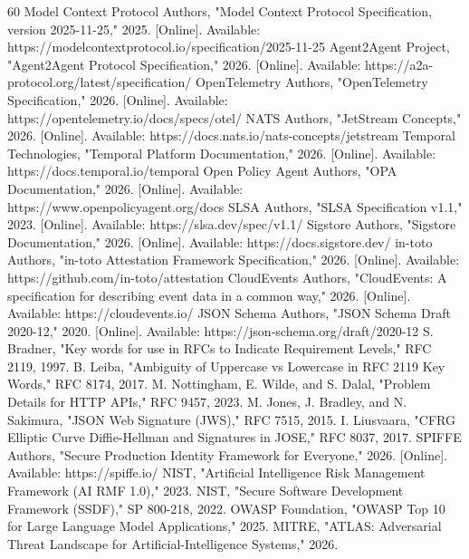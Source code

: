 \documentclass[10pt,journal,onecolumn]{IEEEtran}
\begin{document}
\begin{thebibliography}{60}
 Model Context Protocol Authors, "Model Context Protocol Specification, version 2025-11-25," 2025. [Online]. Available: https://modelcontextprotocol.io/specification/2025-11-25
 Agent2Agent Project, "Agent2Agent Protocol Specification," 2026. [Online]. Available: https://a2a-protocol.org/latest/specification/
 OpenTelemetry Authors, "OpenTelemetry Specification," 2026. [Online]. Available: https://opentelemetry.io/docs/specs/otel/
 NATS Authors, "JetStream Concepts," 2026. [Online]. Available: https://docs.nats.io/nats-concepts/jetstream
 Temporal Technologies, "Temporal Platform Documentation," 2026. [Online]. Available: https://docs.temporal.io/temporal
 Open Policy Agent Authors, "OPA Documentation," 2026. [Online]. Available: https://www.openpolicyagent.org/docs
 SLSA Authors, "SLSA Specification v1.1," 2023. [Online]. Available: https://slsa.dev/spec/v1.1/
 Sigstore Authors, "Sigstore Documentation," 2026. [Online]. Available: https://docs.sigstore.dev/
 in-toto Authors, "in-toto Attestation Framework Specification," 2026. [Online]. Available: https://github.com/in-toto/attestation
 CloudEvents Authors, "CloudEvents: A specification for describing event data in a common way," 2026. [Online]. Available: https://cloudevents.io/
 JSON Schema Authors, "JSON Schema Draft 2020-12," 2020. [Online]. Available: https://json-schema.org/draft/2020-12
 S. Bradner, "Key words for use in RFCs to Indicate Requirement Levels," RFC 2119, 1997.
 B. Leiba, "Ambiguity of Uppercase vs Lowercase in RFC 2119 Key Words," RFC 8174, 2017.
 M. Nottingham, E. Wilde, and S. Dalal, "Problem Details for HTTP APIs," RFC 9457, 2023.
 M. Jones, J. Bradley, and N. Sakimura, "JSON Web Signature (JWS)," RFC 7515, 2015.
 I. Liusvaara, "CFRG Elliptic Curve Diffie-Hellman and Signatures in JOSE," RFC 8037, 2017.
 SPIFFE Authors, "Secure Production Identity Framework for Everyone," 2026. [Online]. Available: https://spiffe.io/
 NIST, "Artificial Intelligence Risk Management Framework (AI RMF 1.0)," 2023.
 NIST, "Secure Software Development Framework (SSDF)," SP 800-218, 2022.
 OWASP Foundation, "OWASP Top 10 for Large Language Model Applications," 2025.
 MITRE, "ATLAS: Adversarial Threat Landscape for Artificial-Intelligence Systems," 2026.

\end{thebibliography}
\end{document}
